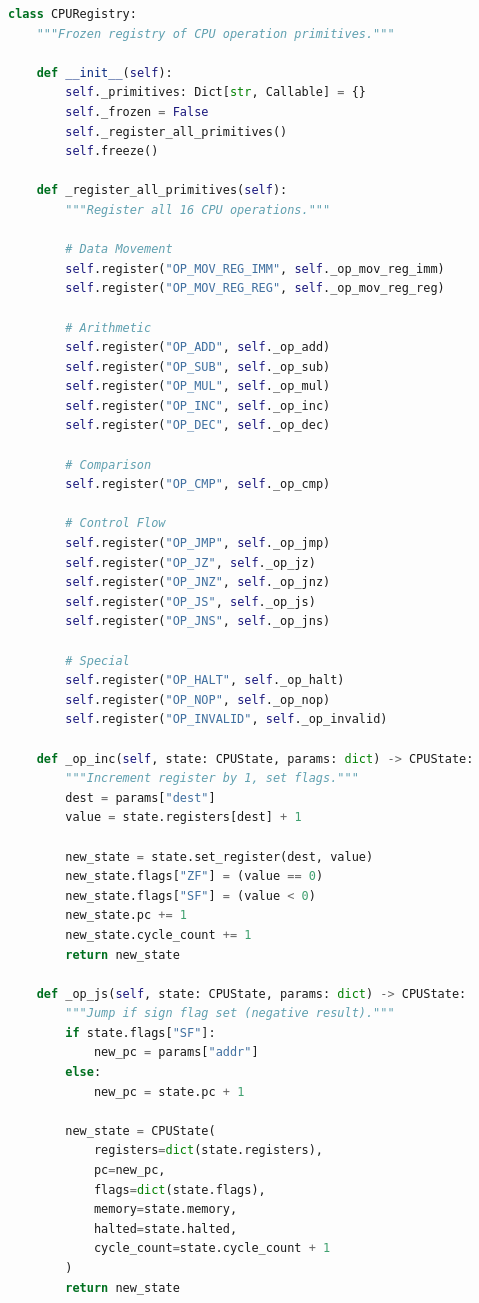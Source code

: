 \documentclass[11pt,a4paper]{article}
\begin{document}
\begin{lstlisting}[language=Python, caption={registry.py - CPU Primitives}]
class CPURegistry:
    """Frozen registry of CPU operation primitives."""

    def __init__(self):
        self._primitives: Dict[str, Callable] = {}
        self._frozen = False
        self._register_all_primitives()
        self.freeze()

    def _register_all_primitives(self):
        """Register all 16 CPU operations."""

        # Data Movement
        self.register("OP_MOV_REG_IMM", self._op_mov_reg_imm)
        self.register("OP_MOV_REG_REG", self._op_mov_reg_reg)

        # Arithmetic
        self.register("OP_ADD", self._op_add)
        self.register("OP_SUB", self._op_sub)
        self.register("OP_MUL", self._op_mul)
        self.register("OP_INC", self._op_inc)
        self.register("OP_DEC", self._op_dec)

        # Comparison
        self.register("OP_CMP", self._op_cmp)

        # Control Flow
        self.register("OP_JMP", self._op_jmp)
        self.register("OP_JZ", self._op_jz)
        self.register("OP_JNZ", self._op_jnz)
        self.register("OP_JS", self._op_js)
        self.register("OP_JNS", self._op_jns)

        # Special
        self.register("OP_HALT", self._op_halt)
        self.register("OP_NOP", self._op_nop)
        self.register("OP_INVALID", self._op_invalid)

    def _op_inc(self, state: CPUState, params: dict) -> CPUState:
        """Increment register by 1, set flags."""
        dest = params["dest"]
        value = state.registers[dest] + 1

        new_state = state.set_register(dest, value)
        new_state.flags["ZF"] = (value == 0)
        new_state.flags["SF"] = (value < 0)
        new_state.pc += 1
        new_state.cycle_count += 1
        return new_state

    def _op_js(self, state: CPUState, params: dict) -> CPUState:
        """Jump if sign flag set (negative result)."""
        if state.flags["SF"]:
            new_pc = params["addr"]
        else:
            new_pc = state.pc + 1

        new_state = CPUState(
            registers=dict(state.registers),
            pc=new_pc,
            flags=dict(state.flags),
            memory=state.memory,
            halted=state.halted,
            cycle_count=state.cycle_count + 1
        )
        return new_state
\end{lstlisting}
\end{document}
